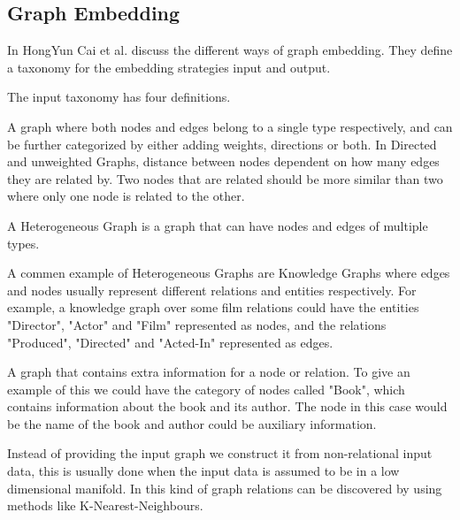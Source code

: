 \subsection{Graph Embedding}
In \cite{8294302} HongYun Cai et al. discuss the different ways of graph embedding. They define a taxonomy for the embedding strategies input and output.

The input taxonomy has four definitions.  

\begin{definition} A graph where both nodes and edges belong to a single type respectively, and can be further categorized by either adding weights, directions or both. In Directed and unweighted Graphs, distance between nodes dependent on how many edges they are related by. Two nodes that are related should be more similar than two where only one node is related to the other\cite{8294302}.
\end{definition}

\begin{definition} A Heterogeneous Graph is a graph that can have nodes and edges of multiple types\cite{8294302}. 
\end{definition}

A commen example of Heterogeneous Graphs are Knowledge Graphs where edges and nodes usually represent different relations and entities respectively. For example, a knowledge graph over some film relations could have the entities "Director", "Actor" and "Film" represented as nodes, and the relations "Produced", "Directed" and "Acted-In" represented as edges.

\begin{definition} A graph that contains extra information for a node or relation. To give an example of this we could have the category of nodes called "Book", which contains information about the book and its author. The node in this case would be the name of the book and author could be auxiliary information\cite{8294302}.
\end{definition}

\begin{definition} Instead of providing the input graph we construct it from non-relational input data, this is usually done when the input data is assumed to be in a low dimensional manifold. In this kind of graph relations can be discovered by using methods like K-Nearest-Neighbours\cite{8294302}.
\end{definition}

